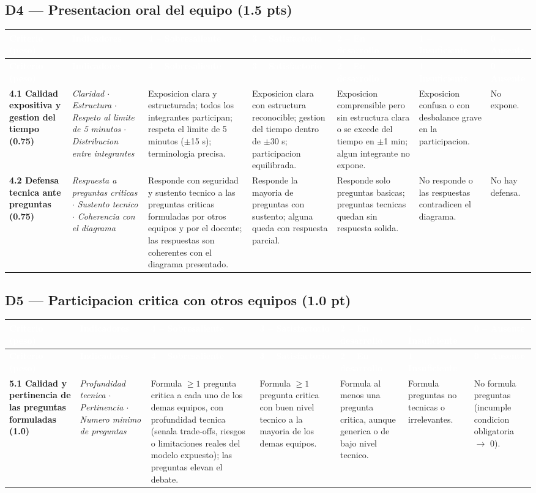 \documentclass[10pt]{article}
\newcommand{\rubheader}{\rowcolor{uteqBlue}\textbf{\textcolor{white}{Criterio (peso)}} & \textbf{\textcolor{white}{Indicadores}} & \textbf{\textcolor{white}{4 -- Sobresaliente}} & \textbf{\textcolor{white}{3 -- Satisfactorio}} & \textbf{\textcolor{white}{2 -- En desarrollo}} & \textbf{\textcolor{white}{1 -- Insuficiente}} & \textbf{\textcolor{white}{0 -- Ausente}}\\\hline}
\begin{document}
\subsection{D4 --- Presentacion oral del equipo (1.5 pts)}

\begin{xltabular}{\textwidth}{|>{\RaggedRight\small}p{2.7cm}|>{\RaggedRight\small}p{2.8cm}|>{\RaggedRight\small}X|>{\RaggedRight\small}X|>{\RaggedRight\small}X|>{\RaggedRight\small}X|>{\RaggedRight\small}X|}
	\hline
	\rubheader
	\endfirsthead
	\hline
	\rubheader
	\endhead
	\textbf{4.1 Calidad expositiva y gestion del tiempo (0.75)} & \textit{Claridad $\cdot$ Estructura $\cdot$ Respeto al limite de 5 minutos $\cdot$ Distribucion entre integrantes} & Exposicion clara y estructurada; todos los integrantes participan; respeta el limite de 5 minutos ($\pm$15 s); terminologia precisa. & Exposicion clara con estructura reconocible; gestion del tiempo dentro de $\pm$30 s; participacion equilibrada. & Exposicion comprensible pero sin estructura clara o se excede del tiempo en $\pm$1 min; algun integrante no expone. & Exposicion confusa o con desbalance grave en la participacion. & No expone.\\
	\hline
	\textbf{4.2 Defensa tecnica ante preguntas (0.75)} & \textit{Respuesta a preguntas criticas $\cdot$ Sustento tecnico $\cdot$ Coherencia con el diagrama} & Responde con seguridad y sustento tecnico a las preguntas criticas formuladas por otros equipos y por el docente; las respuestas son coherentes con el diagrama presentado. & Responde la mayoria de preguntas con sustento; alguna queda con respuesta parcial. & Responde solo preguntas basicas; preguntas tecnicas quedan sin respuesta solida. & No responde o las respuestas contradicen el diagrama. & No hay defensa.\\
	\hline
\end{xltabular}

\subsection{D5 --- Participacion critica con otros equipos (1.0 pt)}

\begin{xltabular}{\textwidth}{|>{\RaggedRight\small}p{2.7cm}|>{\RaggedRight\small}p{2.8cm}|>{\RaggedRight\small}X|>{\RaggedRight\small}X|>{\RaggedRight\small}X|>{\RaggedRight\small}X|>{\RaggedRight\small}X|}
	\hline
	\rubheader
	\endfirsthead
	\hline
	\rubheader
	\endhead
	\textbf{5.1 Calidad y pertinencia de las preguntas formuladas (1.0)} & \textit{Profundidad tecnica $\cdot$ Pertinencia $\cdot$ Numero minimo de preguntas} & Formula $\geq 1$ pregunta critica a cada uno de los demas equipos, con profundidad tecnica (senala trade-offs, riesgos o limitaciones reales del modelo expuesto); las preguntas elevan el debate. & Formula $\geq 1$ pregunta critica con buen nivel tecnico a la mayoria de los demas equipos. & Formula al menos una pregunta critica, aunque generica o de bajo nivel tecnico. & Formula preguntas no tecnicas o irrelevantes. & No formula preguntas (incumple condicion obligatoria $\rightarrow$ 0).\\
	\hline
\end{xltabular}
\end{document}
